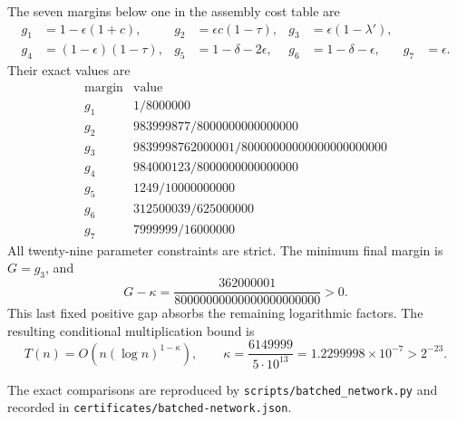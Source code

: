 The seven margins below one in the assembly cost table are
\[
\begin{aligned}
 g_1&=1-\epsilon(1+c),&
 g_2&=\epsilon c(1-\tau),&
 g_3&=\epsilon(1-\lambda'),\\
 g_4&=(1-\epsilon)(1-\tau),&
 g_5&=1-\delta-2\epsilon,&
 g_6&=1-\delta-\epsilon,&
 g_7&=\epsilon.
\end{aligned}
\]
Their exact values are
\[
\begin{array}{c|c}
 \text{margin}&\text{value}\\\hline
 g_1&1/8000000\\
 g_2&983999877/8000000000000000\\
 g_3&9839998762000001/80000000000000000000000\\
 g_4&984000123/8000000000000000\\
 g_5&1249/10000000000\\
 g_6&312500039/625000000\\
 g_7&7999999/16000000
\end{array}
\]
All twenty-nine parameter constraints are strict. The minimum final
margin is $G=g_3$, and
\[
 G-\kappa=
 \frac{362000001}{80000000000000000000000}>0.
\]
This last fixed positive gap absorbs the remaining logarithmic factors.
The resulting conditional multiplication bound is
\[
 \boxed{
 T(n)=O\!\left(n(\log n)^{1-\kappa}\right),\qquad
 \kappa=\frac{6149999}{5\cdot10^{13}}
       =1.2299998\times10^{-7}>2^{-23}.}
\]

The exact comparisons are reproduced by
\texttt{scripts/batched\_network.py} and recorded in
\texttt{certificates/batched-network.json}.
